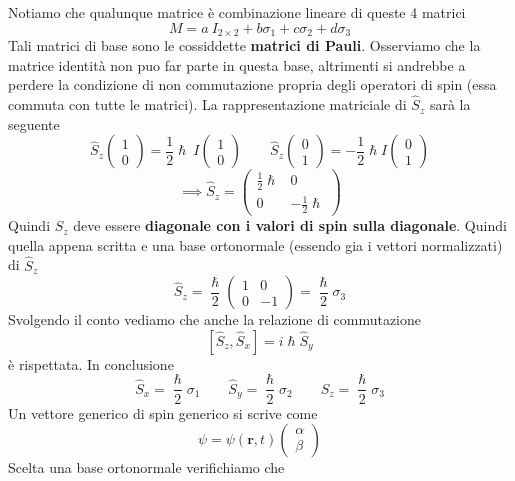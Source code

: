 Notiamo che qualunque matrice è combinazione lineare di queste 4
matrici
\[
	M = a \ I_{2 \times 2} + b \sigma_{1} + c \sigma_{2} + d \sigma_{3}
\]
Tali matrici di base sono le cossiddette \textbf{matrici di Pauli}.
Osserviamo che la matrice identità non puo far parte in questa base,
altrimenti si andrebbe a perdere la condizione di non commutazione
propria degli operatori di spin (essa commuta con tutte le matrici).
La
rappresentazione matriciale di \(\hat{S}_{z}\) sarà la seguente \[
	\hat{S}_{z} \begin{pmatrix}
		1 \\
		0
	\end{pmatrix} =
	\frac{1}{2} \hslash \ I
	\begin{pmatrix}
		1 \\
		0
	\end{pmatrix}
	\qquad
	\hat{S}_{z} \begin{pmatrix}
		0 \\
		1
	\end{pmatrix}
	= - \frac{1}{2} \hslash I \begin{pmatrix}
		0 \\
		1
	\end{pmatrix}
\] \[
	\implies
	\hat{S}_{z} =
	\begin{pmatrix}
		\frac{1}{2} \hslash & 0                     \\
		0                   & - \frac{1}{2} \hslash
	\end{pmatrix}
\] Quindi \(\hat{S}_{z}\) deve essere \textbf{diagonale con i valori di
	spin sulla diagonale}.
Quindi quella appena scritta e una base
ortonormale (essendo gia i vettori normalizzati) di \(\hat{S}_{z}\)
\[
	\hat{S}_{z} = \frac{\hslash}{2}
	\begin{pmatrix}
		1 & 0  \\
		0 & -1
	\end{pmatrix} = \frac{\hslash}{2} \sigma_{3}
\] Svolgendo il conto vediamo che anche la relazione di commutazione
\[
	[ \hat{S}_{z}, \hat{S}_{x}] = i \hslash \hat{S}_{y}
\]
è rispettata.
In conclusione
\[
	\hat{S}_{x} = \frac{\hslash}{2} \sigma_{1} \qquad
	\hat{S}_{y} =  \frac{\hslash}{2} \sigma_{2} \qquad
	\hat{S}_{z} = \frac{\hslash}{2} \sigma_{3}
\] Un vettore generico di spin generico si scrive come
\[
	\psi = \psi (\bm{r},t)
	\begin{pmatrix}
		\alpha \\
		\beta
	\end{pmatrix}
\]
Scelta una base ortonormale verifichiamo che
